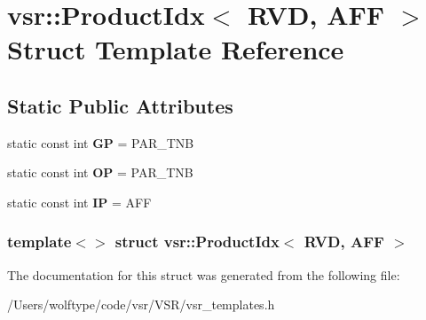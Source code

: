 \hypertarget{structvsr_1_1_product_idx_3_01_r_v_d_00_01_a_f_f_01_4}{\section{vsr\-:\-:Product\-Idx$<$ R\-V\-D, A\-F\-F $>$ Struct Template Reference}
\label{structvsr_1_1_product_idx_3_01_r_v_d_00_01_a_f_f_01_4}
}
\subsection*{Static Public Attributes}
\begin{DoxyCompactItemize}
\item 
\hypertarget{structvsr_1_1_product_idx_3_01_r_v_d_00_01_a_f_f_01_4_a25e3b13fdbc6db9e37681e74dd3f400a}{static const int {\bfseries G\-P} = P\-A\-R\-\_\-\-T\-N\-B}\label{structvsr_1_1_product_idx_3_01_r_v_d_00_01_a_f_f_01_4_a25e3b13fdbc6db9e37681e74dd3f400a}

\item 
\hypertarget{structvsr_1_1_product_idx_3_01_r_v_d_00_01_a_f_f_01_4_a0ee0b3ba78e335e8ae6cf32ca4ac65fb}{static const int {\bfseries O\-P} = P\-A\-R\-\_\-\-T\-N\-B}\label{structvsr_1_1_product_idx_3_01_r_v_d_00_01_a_f_f_01_4_a0ee0b3ba78e335e8ae6cf32ca4ac65fb}

\item 
\hypertarget{structvsr_1_1_product_idx_3_01_r_v_d_00_01_a_f_f_01_4_a46634f541bd7383ea47bead52b026866}{static const int {\bfseries I\-P} = A\-F\-F}\label{structvsr_1_1_product_idx_3_01_r_v_d_00_01_a_f_f_01_4_a46634f541bd7383ea47bead52b026866}

\end{DoxyCompactItemize}
\subsubsection*{template$<$$>$ struct vsr\-::\-Product\-Idx$<$ R\-V\-D, A\-F\-F $>$}



The documentation for this struct was generated from the following file\-:\begin{DoxyCompactItemize}
\item 
/\-Users/wolftype/code/vsr/\-V\-S\-R/vsr\-\_\-templates.\-h\end{DoxyCompactItemize}
